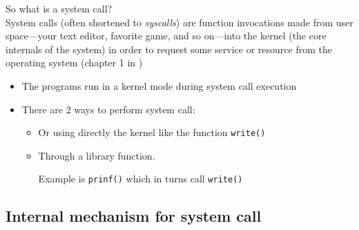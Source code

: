 \documentclass[12pt,a4paper]{book}
\begin{document}
So what is a system call?\\

System calls (often shortened to \textit{syscalls}) are function invocations made from user space—your text editor, favorite game, and so on—into the kernel (the core internals of the system) in order to request some service or resource from the operating system (chapter 1 in \cite{book_Linux_System_Programming_Robert_Love}) 



\begin{itemize}

\item  The programs run in a kernel mode during system call execution

\item There are 2 ways to perform system call:

\begin{itemize}
    \item Or using directly the kernel like the function \verb|write()|
    
    \item Through a library function.

    Example is \verb|prinf()| which in turns call \verb|write()|

\end{itemize}

\end{itemize}

\newpage
\subsection{Internal mechanism for system call}
\end{document}
